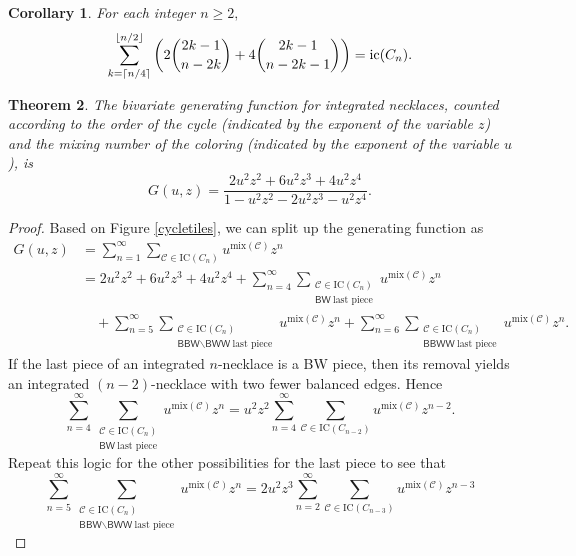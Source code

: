 \documentclass[11pt, reqno]{amsart}
\newtheorem{theorem}{Theorem} %
\newtheorem{corollary}[theorem]{Corollary}
\theoremstyle{definition}
\renewcommand{\geq}{\geqslant}
\begin{document}
\begin{corollary}
For each integer $n \geq 2,$
\[\sum\limits_{k = \lceil n/4 \rceil}^{\lfloor n/2 \rfloor} \left(2\binom{2k-1}{n-2k} + 4\binom{2k-1}{n-2k-1}\right) = \textup{ic}(C_n).\]
\end{corollary}

\begin{theorem}
The bivariate generating function for integrated necklaces, counted according to the order of the cycle (indicated by the exponent of the variable $z$) and the mixing number of the coloring (indicated by the exponent of the variable $u$), is
\[G(u, z) = \frac{2u^2z^2+6u^2z^3+4u^2z^4}{1-u^2z^2-2u^2z^3-u^2z^4}.\]
\end{theorem}

\begin{proof}
Based on Figure \ref{cycletiles}, we can split up the generating function as
\begin{align}
G(u, z) &= \sum_{n = 1}^{\infty}\sum_{\mathcal{C} \in \text{IC}(C_n)} u^{\text{mix}(\mathcal{C})}z^n
\\ &=2u^2z^2 + 6u^2z^3 + 4u^2z^4 + \sum_{n = 4}^{\infty}\sum_{\substack{\mathcal{C} \in \text{IC}(C_n) \\ \textsf{BW}\ \text{last piece}}} u^{\text{mix}(\mathcal{C})}z^n \nonumber \\
 &\hspace{1em} + \sum_{n = 5}^{\infty}\sum_{\substack{\mathcal{C} \in \text{IC}(C_n) \\ \textsf{BBW}\backslash\textsf{BWW}\ \text{last piece}}} u^{\text{mix}(\mathcal{C})}z^n + \sum_{n = 6}^{\infty}\sum_{\substack{\mathcal{C} \in \text{IC}(C_n) \\ \textsf{BBWW}\ \text{last piece}}} u^{\text{mix}(\mathcal{C})}z^n.
\end{align}
If the last piece of an integrated $n$-necklace is a \textsf{BW} piece, then its removal yields an integrated $(n-2)$-necklace with two fewer balanced edges. Hence
\begin{equation}
    \sum_{n = 4}^{\infty}\sum_{\substack{\mathcal{C} \in \text{IC}(C_n) \\ \textsf{BW}\ \text{last piece}}} u^{\text{mix}(\mathcal{C})}z^n = u^2z^2\sum_{n = 4}^{\infty}\sum_{\mathcal{C} \in \text{IC}(C_{n-2})} u^{\text{mix}(\mathcal{C})}z^{n-2}.
\end{equation}
Repeat this logic for the other possibilities for the last piece to see that
\begin{equation}
\sum_{n = 5}^{\infty}\sum_{\substack{\mathcal{C} \in \text{IC}(C_n) \\ \textsf{BBW}\backslash\textsf{BWW}\ \text{last piece}}} u^{\text{mix}(\mathcal{C})}z^n = 2u^2z^3\sum_{n = 2}^{\infty}\sum_{\mathcal{C} \in \text{IC}(C_{n-3})} u^{\text{mix}(\mathcal{C})}z^{n-3}

\end{equation}
\end{proof}
\end{document}
